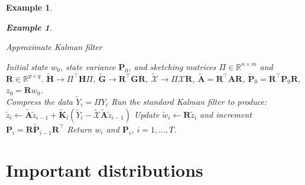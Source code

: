 \documentclass[10pt]{article}
\newtheorem{example}[ex]{Example}
\newcommand{\R}{\mathbb{R}}
\newcommand{\X}{\mathcal{X}}
\begin{document}
\begin{example}
\begin{example}
\begin{algorithm}[t!]
  \caption{Approximate Kalman filter\label{alg:kalman}}
  \begin{algorithmic}[1]
  Initial state $w_0$, state variance $\mathbf{P}_0$,
    and sketching matrices $\Pi\in\R^{n\times m}$ and
    $\mathbf{R}\in\R^{p\times q}$.
   $\tilde{\mathbf{H}}\rightarrow\Pi^\top
  \mathbf{H} \Pi$, $\tilde{\mathbf{G}}\rightarrow \mathbf{R}^\top
  \mathbf{G}\mathbf{R}$, $\tilde{\X}\rightarrow \Pi\X\mathbf{R}$,
  $\tilde{\mathbf{A}} = \mathbf{R}^\top \mathbf{A} \mathbf{R}$,
  $\tilde{\mathbf{P}}_0 = \mathbf{R}^\top \mathbf{P}_0\mathbf{R}$,
  $z_0=\mathbf{R}w_0$. \\ 
    \STATE Compress the data $\tilde{Y}_i=\Pi Y_i$
    \STATE Run the standard Kalman filter to produce:
    $
    \tilde{z}_{i} \leftarrow
    \tilde{\mathbf{A}}\tilde{z}_{i-1}+\tilde{\mathbf{K}}_i(\tilde{Y}_i -
    \tilde{\X}\tilde{\mathbf{A}}\tilde{z}_{i-1}) 
    $
    \STATE Update 
    $\tilde{w}_i \leftarrow \mathbf{R}\tilde{z}_i$ and increment $\mathbf{P}_{i} = 
    \mathbf{R}\tilde{\mathbf{P}}_{i-1} \mathbf{R}^\top$\;
  \ENDFOR
  \STATE Return $w_i$ and $\mathbf{P}_i$, $i=1,\ldots,T$.
\end{algorithmic}
\end{algorithm}


\section{Important distributions}
\label{sec:import-distr}


\end{example}
\end{example}
\end{document}
